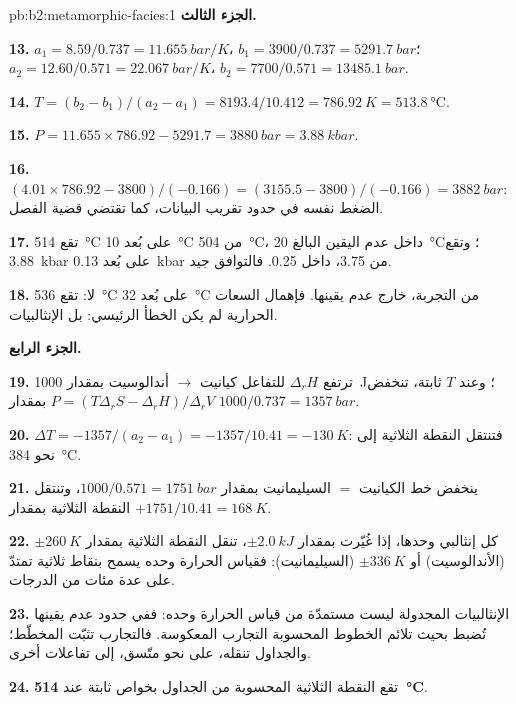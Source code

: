 \begin{solution}{pb:b2:metamorphic-facies:1}
\noindent\textbf{الجزء الثالث.}

\textbf{13.} $a_1 = 8.59/0.737 = \qty{11.655}{bar/K}$، $b_1 = 3900/0.737 =
\qty{5291.7}{bar}$؛ $a_2 = 12.60/0.571 = \qty{22.067}{bar/K}$، $b_2 = 7700/0.571 =
\qty{13485.1}{bar}$.

\textbf{14.} $T = (b_2 - b_1)/(a_2 - a_1) = 8193.4/10.412 = \qty{786.92}{K} =
\qty{513.8}{\celsius}$.

\textbf{15.} $P = 11.655\times786.92 - 5291.7 = \qty{3880}{bar} = \qty{3.88}{kbar}$.

\textbf{16.} $(4.01\times786.92 - 3800)/(-0.166) = (3155.5 - 3800)/(-0.166) =
\qty{3882}{bar}$: الضغط نفسه في حدود تقريب البيانات، كما تقتضي قضية الفصل.

\textbf{17.} تقع \qty{514}{\celsius} على بُعد \qty{10}{\celsius} من \qty{504}{\celsius}، داخل
عدم اليقين البالغ \qty{20}{\celsius}؛ وتقع \qty{3.88}{kbar} على بُعد \qty{0.13}{kbar} من 3.75،
داخل 0.25. فالتوافق جيد.

\textbf{18.} لا: تقع \qty{536}{\celsius} على بُعد \qty{32}{\celsius} من التجربة، خارج
عدم يقينها. فإهمال السعات الحرارية لم يكن الخطأ الرئيسي: بل الإنثالبيات.

\noindent\textbf{الجزء الرابع.}

\textbf{19.} ترتفع $\Delta_r H$ للتفاعل كيانيت $\to$ أندالوسيت بمقدار \qty{1000}{J}؛ وعند
$T$ ثابتة، تنخفض $P = (T\Delta_r S - \Delta_r H)/\Delta_r V$ بمقدار $1000/0.737 = \qty{1357}{bar}$.

\textbf{20.} $\Delta T = -1357/(a_2 - a_1) = -1357/10.41 = \qty{-130}{K}$: فتنتقل النقطة الثلاثية
إلى نحو \qty{384}{\celsius}.

\textbf{21.} ينخفض خط الكيانيت $=$ السيليمانيت بمقدار $1000/0.571 = \qty{1751}{bar}$،
وتنتقل النقطة الثلاثية بمقدار $+1751/10.41 = \qty{+168}{K}$.

\textbf{22.} كل إنثالبي وحدها، إذا غُيّرت بمقدار $\pm\qty{2.0}{kJ}$، تنقل النقطة الثلاثية بمقدار
$\pm\qty{260}{K}$ (الأندالوسيت) أو $\pm\qty{336}{K}$ (السيليمانيت): فقياس الحرارة وحده يسمح
بنقاط ثلاثية تمتدّ على عدة مئات من الدرجات.

\textbf{23.} الإنثالبيات المجدولة ليست مستمدّة من قياس الحرارة وحده: ففي حدود
عدم يقينها تُضبط بحيث تلائم الخطوط المحسوبة التجارب المعكوسة.
فالتجارب تثبّت المخطّط؛ والجداول تنقله، على نحو متّسق، إلى تفاعلات أخرى.

\textbf{24.} تقع النقطة الثلاثية المحسوبة من الجداول بخواص ثابتة عند
\textbf{\qty[text-series-to-math=true]{514}{\celsius}}.
\end{solution}
